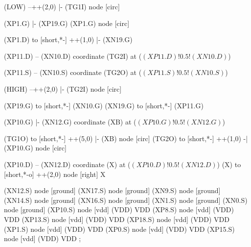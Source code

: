 \begin{circuitikz}[american]
	(LOW) --++(2,0) |- (TG1I) node [circ] {}
	
	(XP1.G) |- (XP19.G)
	(XP1.G) node [circ] {}
	
	(XP1.D) to [short,*-] ++(1,0) |- (XN19.G)
	
	(XP11.D) -- (XN10.D)
	coordinate (TG2I) at ($(XP11.D)!0.5!(XN10.D)$)
	
	(XP11.S) -- (XN10.S)
	coordinate (TG2O) at ($(XP11.S)!0.5!(XN10.S)$)
	
	(HIGH) --++(2,0) |- (TG2I) node [circ] {}
	
	(XP19.G) to [short,*-] (XN10.G)
	(XN19.G) to [short,*-] (XP11.G)
	
	(XP10.G) |- (XN12.G)
	coordinate (XB) at ($(XP10.G)!0.5!(XN12.G)$)	
	
	
	(TG1O) to [short,*-] ++(5,0) |- (XB) node [circ] {}%
	(TG2O) to [short,*-] ++(1,0) -| (XP10.G) node [circ] {} %
	
	(XP10.D) -- (XN12.D)
	coordinate (X) at ($(XP10.D)!0.5!(XN12.D)$)	
	(X) to [short,*-o] ++(2,0) node [right] {X}
		

	(XN12.S) node [ground] {}
	(XN17.S) node [ground] {}
	(XN9.S) node [ground] {}
	(XN14.S) node [ground] {}
	(XN16.S) node [ground] {}
	(XN1.S) node [ground] {}
	(XN0.S) node [ground] {}
	(XP10.S) node [vdd] (VDD) {VDD}
	(XP8.S) node [vdd] (VDD) {VDD}
	(XP13.S) node [vdd] (VDD) {VDD}
	(XP18.S) node [vdd] (VDD) {VDD}
	(XP1.S) node [vdd] (VDD) {VDD}
	(XP0.S) node [vdd] (VDD) {VDD}
	(XP15.S) node [vdd] (VDD) {VDD}
;

\end{circuitikz}
